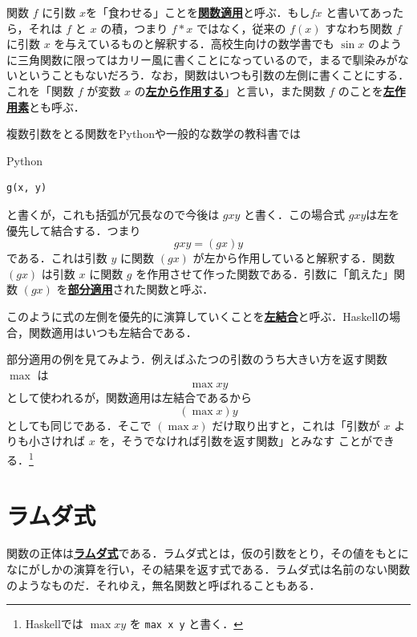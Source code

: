 \documentclass[a5paper,twoside,fleqn,draft]{jsbook}
\newcommand{\programminglanguage}[1]{\textsf{#1}}
\newcommand{\haskell}{\programminglanguage{Haskell}}
\newcommand{\python}{\programminglanguage{Python}}
\newcommand{\keyword}[1]{{\underline{\textbf{#1}}}}
\newcommand{\code}[1]{\texttt{#1}}
\newenvironment{pythoncode}{\begin{itembox}[r]{\python}}{\end{itembox}}
\newcommand{\mSpecialFunc}[1]{\mathrm{#1}}
\DeclareMathOperator{\mMax}{\mSpecialFunc{max}}
\begin{document}

関数 $f$ に引数 $x$を「食わせる」ことを\keyword{関数適用}と呼ぶ．もし$fx$ と書いてあったら，それは $f$ と $x$ の積，つまり $f*x$ ではなく，従来の $f(x)$ すなわち関数 $f$ に引数 $x$ を与えているものと解釈する．高校生向けの数学書でも $\sin x$ のように三角関数に限ってはカリー風に書くことになっているので，まるで馴染みがないということもないだろう．なお，関数はいつも引数の左側に書くことにする．これを「関数 $f$ が変数 $x$ の\keyword{左から作用する}」と言い，また関数 $f$ のことを\keyword{左作用素}とも呼ぶ．

複数引数をとる関数を\python や一般的な数学の教科書では
\begin{pythoncode}
\begin{verbatim}
g(x, y)
\end{verbatim}
\end{pythoncode}
と書くが，これも括弧が冗長なので今後は $gxy$ と書く．この場合式 $gxy$は左を優先して結合する．つまり
\begin{equation}
  gxy=(gx)y
\end{equation}
である．これは引数 $y$ に関数 $(gx)$ が左から作用していると解釈する．関数 $(gx)$ は引数 $x$ に関数 $g$ を作用させて作った関数である．引数に「飢えた」関数 $(gx)$ を\keyword{部分適用}された関数と呼ぶ．

このように式の左側を優先的に演算していくことを\keyword{左結合}と呼ぶ．\haskell の場合，関数適用はいつも左結合である．

部分適用の例を見てみよう．例えばふたつの引数のうち大きい方を返す関数
$\mMax$ は
\begin{equation}
  \mMax xy
\end{equation}
として使われるが，関数適用は左結合であるから
\begin{equation}
  (\mMax x)y
\end{equation}
としても同じである．そこで $(\mMax x)$ だけ取り出すと，これは「引数が $x$ よりも小さければ $x$ を，そうでなければ引数を返す関数」とみなす
ことができる．\footnote{\haskell では $\mMax xy$ を \code{max x y} と書く．}

\section{ラムダ式}

関数の正体は\keyword{ラムダ式}である．ラムダ式とは，仮の引数をとり，その値をもとになにがしかの演算を行い，その結果を返す式である．ラムダ式は名前のない関数のようなものだ．それゆえ，無名関数と呼ばれることもある．
\end{document}
